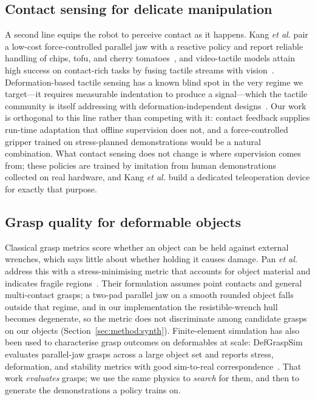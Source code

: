 \subsection{Contact sensing for delicate manipulation}
A second line equips the robot to perceive contact as it happens. Kang \emph{et al.} pair a
low-cost force-controlled parallel jaw with a reactive policy and report reliable handling of
chips, tofu, and cherry tomatoes~\cite{kang2026learning}, and video-tactile models attain high
success on contact-rich tasks by fusing tactile streams with
vision~\cite{vtam}. Deformation-based tactile sensing has a known blind spot in the very
regime we target---it requires measurable indentation to produce a signal---which the tactile
community is itself addressing with deformation-independent
designs~\cite{lighttact}. Our work is orthogonal to this line rather than competing with it:
contact feedback supplies run-time adaptation that offline supervision does not, and a
force-controlled gripper trained on stress-planned demonstrations would be a natural
combination. What contact sensing does not change is where supervision comes from; these
policies are trained by imitation from human demonstrations collected on real hardware, and
Kang \emph{et al.} build a dedicated teleoperation device for exactly that purpose.

\subsection{Grasp quality for deformable objects}
Classical grasp metrics score whether an object can be held against external wrenches, which
says little about whether holding it causes damage. Pan \emph{et al.} address this with a
stress-minimising metric that accounts for object material and indicates fragile
regions~\cite{pan2020stressmin}. Their formulation assumes point contacts and general
multi-contact grasps; a two-pad parallel jaw on a smooth rounded object falls outside that
regime, and in our implementation the resistible-wrench hull becomes degenerate, so the metric
does not discriminate among candidate grasps on our objects (Section~\ref{sec:method:synth}).
Finite-element simulation has also been used to characterise grasp outcomes on deformables at
scale: DefGraspSim evaluates parallel-jaw grasps across a large object set and reports stress,
deformation, and stability metrics with good sim-to-real
correspondence~\cite{defgraspsim}. That work \emph{evaluates} grasps; we use the same physics
to \emph{search} for them, and then to generate the demonstrations a policy trains on.


